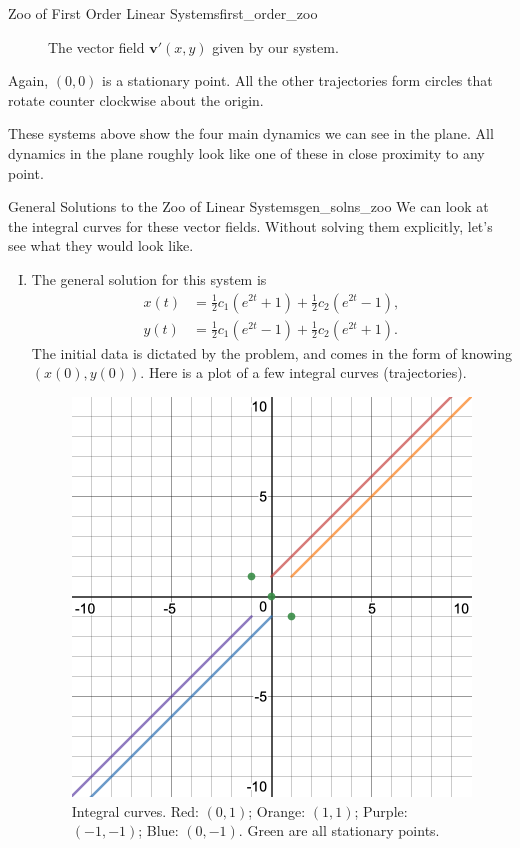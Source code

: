 \begin{ex}{Zoo of First Order Linear Systems}{first_order_zoo}
\begin{enumerate}[(I)]
\begin{figure}[H]
                \caption{The vector field $\mathbf{v}'(x,y)$ given by our system.}
            \end{figure}
            Again, $(0,0)$ is a stationary point.  All the other trajectories form circles that rotate counter clockwise about the origin.
        \end{enumerate}
        \end{ex}
        
        These systems above show the four main dynamics we can see in the plane. All dynamics in the plane roughly look like one of these in close proximity to any point.
        
        \begin{ex}{General Solutions to the Zoo of Linear Systems}{gen_solns_zoo}
        We can look at the integral curves for these vector fields.  Without solving them explicitly, let's see what they would look like.
        \begin{enumerate}[(I)]
            \item The general solution for this system is
            \begin{align*}
                x(t)&= \frac{1}{2}c_1 \left( e^{2t}+1\right)+\frac{1}{2}c_2\left(e^{2t}-1\right),\\
                y(t)&=\frac{1}{2}c_1 \left( e^{2t}-1\right)+\frac{1}{2}c_2\left(e^{2t}+1\right).
            \end{align*}
            The initial data is dictated by the problem, and comes in the form of knowing $(x(0),y(0))$.  Here is a plot of a few integral curves (trajectories).
            \begin{figure}[H]
                \centering
                \includegraphics[width=.6\textwidth]{Figures_Part_7/x+yx+yintegralcurves.png}
                \caption{Integral curves. Red: $(0,1)$; Orange: $(1,1)$; Purple: $(-1,-1)$; Blue: $(0,-1)$. Green are all stationary points.}

\end{figure}
\end{enumerate}
\end{ex}
